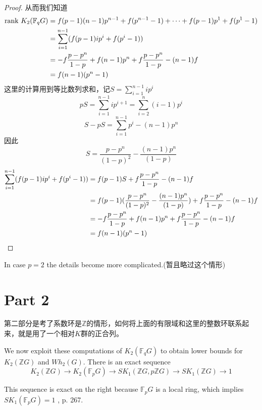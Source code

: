 \begin{proof}
从而我们知道
\begin{align*}
\mathrm{rank\ } K_2 (\mathbb{F}_q G) & = f(p-1)(n-1)p^{n-1}  +f(p^{n- 1}-1) + \cdots + f(p-1)p^{1}  +f(p^{1}-1) \\
& = \sum_{i=1}^{n-1}(f(p-1)ip^i  +f(p^i-1))\\
& = -f \frac{p-p^n}{1-p}+f(n-1)p^n +f \frac{p-p^n}{1-p} -(n-1)f\\
&= f(n-1)(p^n-1)
\end{align*}
这里的计算用到等比数列求和，记$S=\sum_{i=1}^{n-1}ip^i$
\[pS=\sum_{i=1}^{n-1}ip^{i+1}=\sum_{i=2}^{n}(i-1)p^{i}\]
\[S-pS=\sum_{i=1}^{n-1} p^i - (n-1)p^n\]
因此
\[S=\frac{p-p^n}{(1-p)^2}-\frac{(n-1)p^n}{(1-p)}\]
\begin{align*}
\sum_{i=1}^{n-1}(f(p-1)ip^i  +f(p^i-1)) &= f(p-1)S+f \frac{p-p^n}{1-p}-(n-1)f \\
& = f(p-1)(\frac{p-p^n}{(1-p)^2}-\frac{(n-1)p^n}{(1-p)})+f \frac{p-p^n}{1-p}-(n-1)f \\
& = -f \frac{p-p^n}{1-p}+f(n-1)p^n +f \frac{p-p^n}{1-p} -(n-1)f\\
&= f(n-1)(p^n-1) \qedhere
\end{align*}

\end{proof}
In case $p = 2$ the details become more complicated.(暂且略过这个情形)







\section{Part 2} %
\label{sec:第二部分}
第二部分是考了系数环是$\mathbb{Z}$的情形，如何将上面的有限域和这里的整数环联系起来，就是用了一个相对$K$群的正合列。

We now exploit these computations of $K_2(\mathbb{F}_q G)$ to obtain lower bounds for $K_2(\mathbb{Z} G)$ and  $Wh_2(G)$.  There is an exact sequence
\begin{equation}
\label{exact:sk}
K_2(\mathbb{Z}G)\longrightarrow K_2(\mathbb{F}_p G)\longrightarrow SK_1(\mathbb{Z}G, p\mathbb{Z}G)\longrightarrow  SK_1(\mathbb{Z}G)\longrightarrow  1
\end{equation}

This sequence is exact on the right because $\mathbb{F}_p G$ is a local ring, which implies $SK_1(\mathbb{F}_p G)  = 1$ \cite{MR40:2736}, p. 267.

